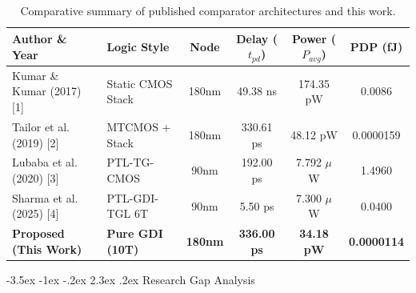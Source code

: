 \documentclass[12pt,a4paper,oneside]{report}
\makeatletter
\renewcommand\section{\@startsection {section}{1}{\z@}%
                                   {-3.5ex \@plus -1ex \@minus -.2ex}%
                                   {2.3ex \@plus.2ex}%
                                   {\normalfont\normalsize\bfseries}}
\makeatother
\begin{document}
\begin{table}[H]
\centering
\caption{Comparative summary of published comparator architectures and this work.}
\label{tab:lit_comparison_summary}
\vspace{0.2cm}
\begin{tabular}{|p{4.2cm}|p{2.8cm}|c|c|c|c|}
\hline
\textbf{Author \& Year} & \textbf{Logic Style} & \textbf{Node} & \textbf{Delay ($t_{pd}$)} & \textbf{Power ($P_{avg}$)} & \textbf{PDP (fJ)} \\
\hline
Kumar \& Kumar (2017) [1] & Static CMOS Stack & 180nm & 49.38 ns & 174.35 pW & 0.0086 \\
\hline
Tailor et al. (2019) [2] & MTCMOS + Stack & 180nm & 330.61 ps & 48.12 pW & 0.0000159 \\
\hline
Lubaba et al. (2020) [3] & PTL-TG-CMOS & 90nm & 192.00 ps & 7.792 $\mu$W & 1.4960 \\
\hline
Sharma et al. (2025) [4] & PTL-GDI-TGL 6T & 90nm & 5.50 ps & 7.300 $\mu$W & 0.0400 \\
\hline
\textbf{Proposed (This Work)} & \textbf{Pure GDI (10T)} & \textbf{180nm} & \textbf{336.00 ps} & \textbf{34.18 pW} & \textbf{0.0000114} \\
\hline
\end{tabular}
\end{table}

\section{Research Gap Analysis}
\end{document}
